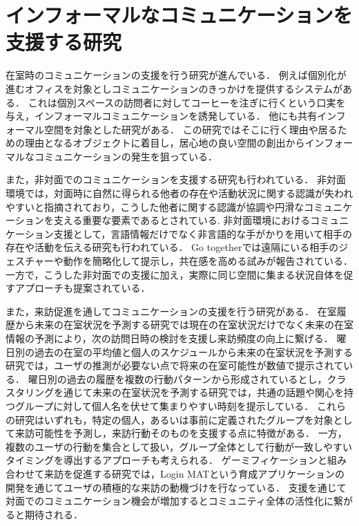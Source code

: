 \section{インフォーマルなコミュニケーションを支援する研究}
\label{sec:format_thesis}
在室時のコミュニケーションの支援を行う研究が進んでいる．
例えば個別化が進むオフィスを対象としコミュニケーションのきっかけを提供するシステム\cite{cafe}がある．
これは個別スペースの訪問者に対してコーヒーを注ぎに行くという口実を与え，インフォーマルコミュニケーションを誘発している．
他にも共有インフォーマル空間を対象とした研究\cite{irori}がある．
この研究ではそこに行く理由や居るための理由となるオブジェクトに着目し，居心地の良い空間の創出からインフォーマルなコミュニケーションの発生を狙っている．


また，非対面でのコミュニケーションを支援する研究も行われている．
非対面環境では，対面時に自然に得られる他者の存在や活動状況に関する認識が失われやすいと指摘されており\cite{awareness}，こうした他者に関する認識が協調や円滑なコミュニケーションを支える重要な要素であるとされている.
非対面環境におけるコミュニケーション支援として，言語情報だけでなく非言語的な手がかりを用いて相手の存在や活動を伝える研究も行われている．
Go together\cite{gotogether}では遠隔にいる相手のジェスチャーや動作を簡略化して提示し，共在感を高める試みが報告されている．
一方で，こうした非対面での支援に加え，実際に同じ空間に集まる状況自体を促すアプローチも提案されている．


また，来訪促進を通してコミュニケーションの支援を行う研究がある．
在室履歴から未来の在室状況を予測する研究では現在の在室状況だけでなく未来の在室情報の予測により，次の訪問日時の検討を支援し来訪頻度の向上に繋げる．
曜日別の過去の在室の平均値と個人のスケジュールから未来の在室状況を予測する研究\cite{yohou}では，ユーザの推測が必要ない点で将来の在室可能性が数値で提示されている．
曜日別の過去の履歴を複数の行動パターンから形成されているとし，クラスタリングを通じて未来の在室状況を予測する研究\cite{hayashi}では，共通の話題や関心を持つグループに対して個人名を伏せて集まりやすい時刻を提示している．
これらの研究はいずれも，特定の個人，あるいは事前に定義されたグループを対象として来訪可能性を予測し，来訪行動そのものを支援する点に特徴がある．
一方，複数のユーザの行動を集合として扱い，グループ全体として行動が一致しやすいタイミングを導出するアプローチも考えられる．
ゲーミフィケーションと組み合わせて来訪を促進する研究\cite{ikusei}では，Login MATという育成アプリケーションの開発を通じてユーザの積極的な来訪の動機づけを行なっている．
支援を通じて対面でのコミュニケーション機会が増加するとコミュニティ全体の活性化に繋がると期待される．


